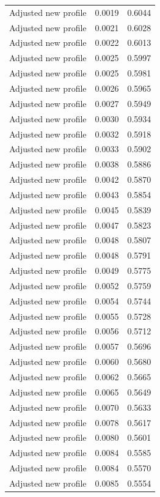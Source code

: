 \begin{table}[htbp]
\begin{tabular}{lll}
Adjusted new profile & 0.0019 & 0.6044 \\
Adjusted new profile & 0.0021 & 0.6028 \\
Adjusted new profile & 0.0022 & 0.6013 \\
Adjusted new profile & 0.0025 & 0.5997 \\
Adjusted new profile & 0.0025 & 0.5981 \\
Adjusted new profile & 0.0026 & 0.5965 \\
Adjusted new profile & 0.0027 & 0.5949 \\
Adjusted new profile & 0.0030 & 0.5934 \\
Adjusted new profile & 0.0032 & 0.5918 \\
Adjusted new profile & 0.0033 & 0.5902 \\
Adjusted new profile & 0.0038 & 0.5886 \\
Adjusted new profile & 0.0042 & 0.5870 \\
Adjusted new profile & 0.0043 & 0.5854 \\
Adjusted new profile & 0.0045 & 0.5839 \\
Adjusted new profile & 0.0047 & 0.5823 \\
Adjusted new profile & 0.0048 & 0.5807 \\
Adjusted new profile & 0.0048 & 0.5791 \\
Adjusted new profile & 0.0049 & 0.5775 \\
Adjusted new profile & 0.0052 & 0.5759 \\
Adjusted new profile & 0.0054 & 0.5744 \\
Adjusted new profile & 0.0055 & 0.5728 \\
Adjusted new profile & 0.0056 & 0.5712 \\
Adjusted new profile & 0.0057 & 0.5696 \\
Adjusted new profile & 0.0060 & 0.5680 \\
Adjusted new profile & 0.0062 & 0.5665 \\
Adjusted new profile & 0.0065 & 0.5649 \\
Adjusted new profile & 0.0070 & 0.5633 \\
Adjusted new profile & 0.0078 & 0.5617 \\
Adjusted new profile & 0.0080 & 0.5601 \\
Adjusted new profile & 0.0084 & 0.5585 \\
Adjusted new profile & 0.0084 & 0.5570 \\
Adjusted new profile & 0.0085 & 0.5554 \\

\end{tabular}
\end{table}
